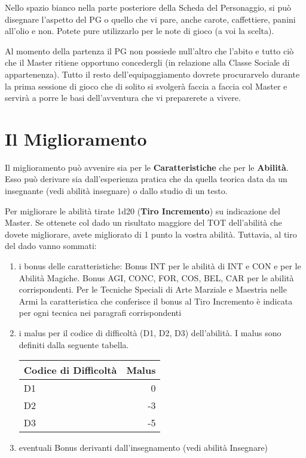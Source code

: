 Nello spazio bianco nella parte posteriore della Scheda del
Personaggio, si pu\`o disegnare l'aspetto del PG o quello che vi
pare, anche carote, caffettiere, panini all'olio e non. Potete pure
utilizzarlo per le note di gioco (a voi la scelta). 

Al momento della
partenza il PG non possiede null'altro che l'abito e tutto ci\`o che
il Master ritiene opportuno concedergli (in relazione alla Classe
Sociale di appartenenza). Tutto il resto dell'equipaggiamento dovrete
procurarvelo durante la prima sessione di gioco che di solito si
svolger\`a faccia a faccia col Master e servir\`a a porre le basi
dell'avventura che vi preparerete a vivere.

\section{Il Miglioramento}
\label{miglioramento}
Il miglioramento pu\`o avvenire sia per le \textbf{Caratteristiche} che per
le \textbf{Abilit\`a}. Esso pu\`o derivare sia dall'esperienza pratica che
da quella teorica data da un insegnante (vedi abilit\`a insegnare) o
dallo studio di un testo.

\label{incremento}
Per migliorare le abilit\`a tirate 1d20 (\textbf{Tiro Incremento}) su
indicazione del Master. Se ottenete col dado un risultato maggiore del
TOT dell'abilit\`a che dovete migliorare, avete migliorato di 1 punto
la vostra abilit\`a. Tuttavia, al tiro del dado vanno sommati:


\begin{enumerate}
\item i bonus delle caratteristiche: Bonus INT per le abilit\`a di
  INT e CON e per le Abilit\`a Magiche. Bonus AGI, CONC, FOR, COS,
  BEL, CAR per le abilit\`a corrispondenti.  Per le Tecniche
  Speciali di Arte Marziale e Maestria nelle Armi la caratteristica
  che conferisce il bonus al Tiro Incremento \`e indicata per ogni
  tecnica nei paragrafi corrispondenti
\item i malus per il codice di difficolt\`a (D1, D2, D3)
  dell'abilit\`a. I malus sono definiti dalla seguente tabella.
  
  \begin{center}
    \begin{tabular}{|l|r|}
      \hline
      Codice di Difficolt\`a & Malus \\ \hline\hline
      D1& 0 \\ \hline
      D2& -3 \\ \hline
      D3& -5 \\ \hline
    \end{tabular}
  \end{center}

\item eventuali Bonus derivanti dall'insegnamento (vedi abilit\`a
  Insegnare)
\end{enumerate}

